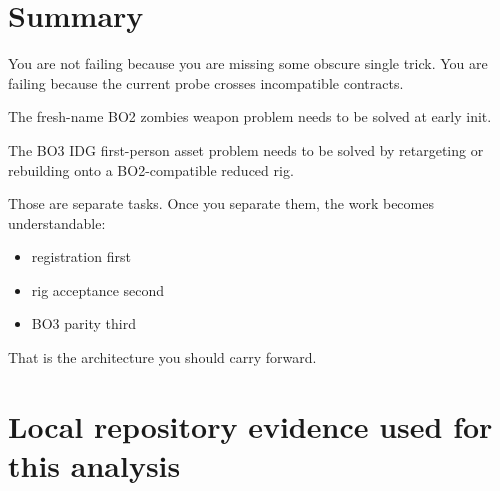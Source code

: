 \documentclass[11pt]{article}
\begin{document}
\section{Summary}

You are not failing because you are missing some obscure single trick. You are failing because the current probe crosses incompatible contracts.

The fresh-name BO2 zombies weapon problem needs to be solved at early init.

The BO3 IDG first-person asset problem needs to be solved by retargeting or rebuilding onto a BO2-compatible reduced rig.

Those are separate tasks. Once you separate them, the work becomes understandable:

\begin{itemize}
  \item registration first
  \item rig acceptance second
  \item BO3 parity third
\end{itemize}

That is the architecture you should carry forward.

\appendix

\section{Local repository evidence used for this analysis}
\end{document}
